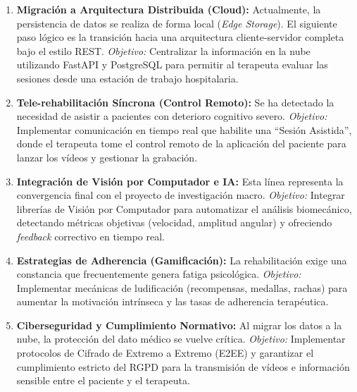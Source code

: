 \begin{enumerate}
    \item \textbf{Migración a Arquitectura Distribuida (Cloud):}
    Actualmente, la persistencia de datos se realiza de forma local (\textit{Edge Storage}). El siguiente paso lógico es la transición hacia una arquitectura cliente-servidor completa bajo el estilo REST. 
    \textit{Objetivo:} Centralizar la información en la nube utilizando FastAPI y PostgreSQL para permitir al terapeuta evaluar las sesiones desde una estación de trabajo hospitalaria.

    \item \textbf{Tele-rehabilitación Síncrona (Control Remoto):} 
    Se ha detectado la necesidad de asistir a pacientes con deterioro cognitivo severo.
    \textit{Objetivo:} Implementar comunicación en tiempo real que habilite una ``Sesión Asistida'', donde el terapeuta tome el control remoto de la aplicación del paciente para lanzar los vídeos y gestionar la grabación.

    \item \textbf{Integración de Visión por Computador e IA:}
    Esta línea representa la convergencia final con el proyecto de investigación macro.
    \textit{Objetivo:} Integrar librerías de Visión por Computador para automatizar el análisis biomecánico, detectando métricas objetivas (velocidad, amplitud angular) y ofreciendo \textit{feedback} correctivo en tiempo real.

    \item \textbf{Estrategias de Adherencia (Gamificación):}
    La rehabilitación exige una constancia que frecuentemente genera fatiga psicológica.
    \textit{Objetivo:} Implementar mecánicas de ludificación (recompensas, medallas, rachas) para aumentar la motivación intrínseca y las tasas de adherencia terapéutica.

    \item \textbf{Ciberseguridad y Cumplimiento Normativo:}
    Al migrar los datos a la nube, la protección del dato médico se vuelve crítica.
    \textit{Objetivo:} Implementar protocolos de Cifrado de Extremo a Extremo (E2EE) y garantizar el cumplimiento estricto del RGPD para la transmisión de vídeos e información sensible entre el paciente y el terapeuta.
\end{enumerate}